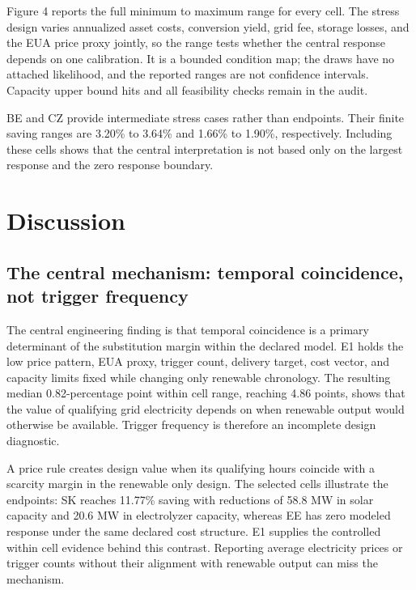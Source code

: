 \documentclass[largeformat]{interact}
\begin{document}
Figure 4 reports the full minimum to maximum range for every cell. The
stress design varies annualized asset costs, conversion yield, grid fee,
storage losses, and the EUA price proxy jointly, so the range tests
whether the central response depends on one calibration. It is a bounded
condition map; the draws have no attached likelihood, and the reported
ranges are not confidence intervals. Capacity upper bound hits and all
feasibility checks remain in the audit.

BE and CZ provide intermediate stress cases rather than endpoints. Their
finite saving ranges are 3.20\% to 3.64\% and 1.66\% to 1.90\%,
respectively. Including these cells shows that the central
interpretation is not based only on the largest response and the zero
response boundary.




\section{Discussion}\label{discussion}

\subsection{The central mechanism: temporal coincidence, not trigger
frequency}\label{the-central-mechanism-temporal-coincidence-not-trigger-frequency}

The central engineering finding is that temporal coincidence is a
primary determinant of the substitution margin within the declared
model. E1 holds the low price pattern, EUA proxy, trigger count,
delivery target, cost vector, and capacity limits fixed while changing
only renewable chronology. The resulting median 0.82-percentage point
within cell range, reaching 4.86 points, shows that the value of
qualifying grid electricity depends on when renewable output would
otherwise be available. Trigger frequency is therefore an incomplete
design diagnostic.

A price rule creates design value when its qualifying hours coincide
with a scarcity margin in the renewable only design. The selected cells
illustrate the endpoints: SK reaches 11.77\% saving with reductions of
58.8 MW in solar capacity and 20.6 MW in electrolyzer capacity, whereas
EE has zero modeled response under the same declared cost structure. E1
supplies the controlled within cell evidence behind this contrast.
Reporting average electricity prices or trigger counts without their
alignment with renewable output can miss the mechanism.
\end{document}
